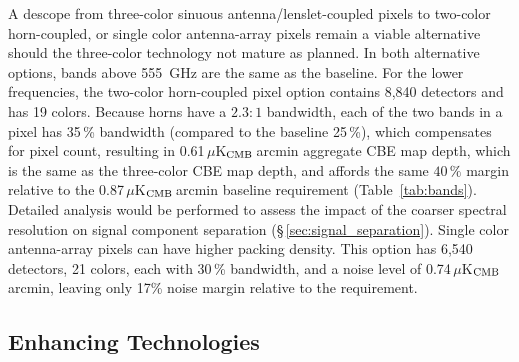 A descope from three-color sinuous antenna/lenslet-coupled pixels to two-color horn-coupled, or single color antenna-array pixels remain a viable alternative should the three-color technology not mature as planned. In both alternative options, bands above 555~GHz are the same as the baseline. For the lower frequencies, the two-color horn-coupled pixel option contains 8,840 detectors and has 19 colors. Because horns have a $2.3:1$ bandwidth, each of the two bands in a pixel has 35\,\% bandwidth (compared to the baseline 25\,\%), which compensates for pixel count, resulting in 0.61\,$\mu$K$_{\rm CMB}$\,arcmin aggregate CBE map depth, which is the same as the three-color CBE map depth, and affords the same $40\,\%$ margin relative to the 0.87\,$\mu$K$_{\rm CMB}$\,arcmin baseline requirement (Table~\ref{tab:bands}). Detailed analysis would be performed to assess the impact of the coarser spectral resolution on signal component separation (\S\,\ref{sec:signal_separation}). Single color antenna-array pixels can have higher packing density. This option has 6,540 detectors, 21 colors, each with 30\,\% bandwidth, and a noise level of 0.74\,$\mu$K$_{\rm CMB}$\,arcmin, leaving only 17\% noise margin relative to the requirement. 


\subsection{Enhancing Technologies}
\label{sec:enhancing_technologies} %


